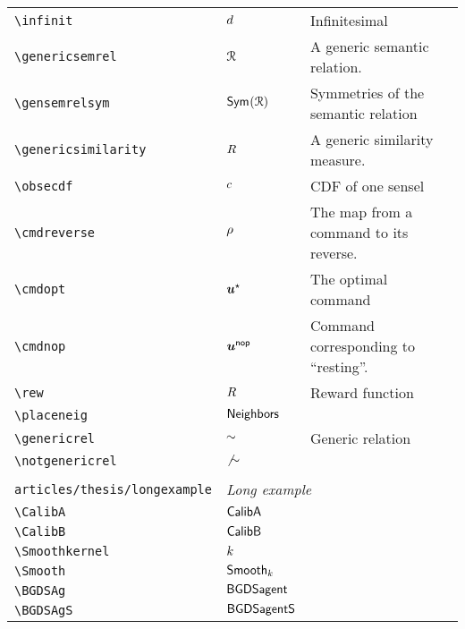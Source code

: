 \begin{longtable}{lll}
 {\color[rgb]{0.5,0.5,0.5}\texttt{\textbackslash infinit}} & $d$ &  Infinitesimal\\ 
 {\color[rgb]{0.5,0.5,0.5}\texttt{\textbackslash genericsemrel}} & $\mathcal{R}$ &  A generic semantic relation.\\ 
 {\color[rgb]{0.5,0.5,0.5}\texttt{\textbackslash gensemrelsym}} & $\mathsf{Sym}^{}(\mathcal{R})$ &  Symmetries of the semantic relation\\ 
 {\color[rgb]{0.5,0.5,0.5}\texttt{\textbackslash genericsimilarity}} & $R$ &  A generic similarity measure.\\ 
 {\color[rgb]{0.5,0.5,0.5}\texttt{\textbackslash obsecdf}} & ${c}$ &  CDF of one sensel\\ 
 {\color[rgb]{0.5,0.5,0.5}\texttt{\textbackslash cmdreverse}} & $\rho$ &  The map from a command to its reverse.\\ 
 {\color[rgb]{0.5,0.5,0.5}\texttt{\textbackslash cmdopt}} & $\boldsymbol{u}^\star$ &  The optimal command\\ 
 {\color[rgb]{0.5,0.5,0.5}\texttt{\textbackslash cmdnop}} & $\boldsymbol{u}^{\mathsf{nop}}$ &  Command corresponding to ``resting''.\\ 
 {\color[rgb]{0.5,0.5,0.5}\texttt{\textbackslash rew}} & $R$ &  Reward function\\ 
 {\color[rgb]{0.5,0.5,0.5}\texttt{\textbackslash placeneig}} & $\mathsf{Neighbors}$ & \\ 
 {\color[rgb]{0.5,0.5,0.5}\texttt{\textbackslash genericrel}} & $\sim$ &  Generic relation\\ 
 {\color[rgb]{0.5,0.5,0.5}\texttt{\textbackslash notgenericrel}} & $\not{\sim}$ & \\ 
  &  & \\ 
 {\color[rgb]{0.5,0.5,0.5}\texttt{articles/thesis/longexample}} & \multicolumn{2}{l}{\emph{Long example}}\\ 
 \hline
{\color[rgb]{0.5,0.5,0.5}\texttt{\textbackslash CalibA}} & $\textsf{{CalibA}}$ & \\ 
 {\color[rgb]{0.5,0.5,0.5}\texttt{\textbackslash CalibB}} & $\textsf{{CalibB}}$ & \\ 
 {\color[rgb]{0.5,0.5,0.5}\texttt{\textbackslash Smoothkernel}} & $k$ & \\ 
 {\color[rgb]{0.5,0.5,0.5}\texttt{\textbackslash Smooth}} & $\textsf{{Smooth}}_{k}$ & \\ 
 {\color[rgb]{0.5,0.5,0.5}\texttt{\textbackslash BGDSAg}} & $\textsf{{BGDSagent}}$ & \\ 
 {\color[rgb]{0.5,0.5,0.5}\texttt{\textbackslash BGDSAgS}} & $\textsf{{BGDSagentS}}$ & \\ 

\end{longtable}

